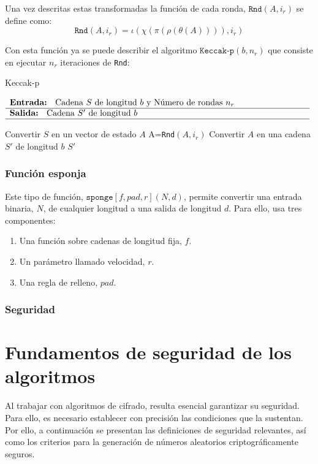 Una vez descritas estas transformadas la función de cada ronda, \(\texttt{Rnd}(A,i_r)\) se define como:
\begin{equation}
	\texttt{Rnd}(A,i_r)=\iota(\chi(\pi(\rho(\theta(A)))),i_r)
\end{equation}

Con esta función ya se puede describir el algoritmo \(\texttt{Keccak-p}(b,n_r)\) que consiste en ejecutar \(n_r\) iteraciones de \texttt{Rnd}:

\begin{algorithm}[H]
\caption{Keccak-p}
$\begin{array}{p{\textwidth}}
	\textbf{Entrada: } Cadena \(S\) de longitud \(b\) y Número de rondas \(n_r\) \\ 
	\hline
	\textbf{Salida: } Cadena \(S'\) de longitud \(b\)\\ 
	\hline
\end{array}$
\begin{algorithmic}[1]
	\State Convertir \(S\) en un vector de estado \(A\)
	\State A=\texttt{Rnd}$(A,i_r)$
	\EndFor
	\State Convertir \(A\) en una cadena \(S'\) de longitud \(b\)
	\State \Return \(S'\)
\end{algorithmic}
\end{algorithm}
\subsubsection{Función esponja}
Este tipo de función, $\texttt{sponge}[f,pad,r](N,d)$, permite convertir una entrada binaria, \(N\), de cualquier longitud a una salida de longitud \(d\). Para ello, usa tres componentes:
\begin{enumerate}
	\item Una función sobre cadenas de longitud fija, \(f\).
	\item Un parámetro llamado velocidad, \(r\).
	\item Una regla de relleno, \(pad\).
\end{enumerate}
\subsubsection{Seguridad}
\section{Fundamentos de seguridad de los algoritmos}
Al trabajar con algoritmos de cifrado, resulta esencial garantizar su seguridad. Para ello, es necesario establecer con precisión las condiciones que la sustentan. Por ello, a continuación se presentan las definiciones de seguridad relevantes, así como los criterios para la generación de números aleatorios criptográficamente seguros.

